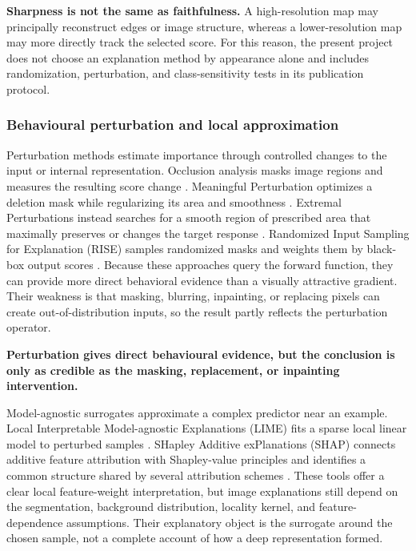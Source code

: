 \textbf{Sharpness is not the same as faithfulness.} A high-resolution map may
principally reconstruct edges or image structure, whereas a lower-resolution
map may more directly track the selected score. For this reason, the present
project does not choose an explanation method by appearance alone and includes
randomization, perturbation, and class-sensitivity tests in its publication
protocol.

\subsubsection{Behavioural perturbation and local approximation}

Perturbation methods estimate importance through controlled changes to the
input or internal representation. Occlusion analysis masks image regions and
measures the resulting score change \cite{zeiler2014visualizing}. Meaningful
Perturbation optimizes a deletion mask while regularizing its area and
smoothness \cite{fong2017meaningful}. Extremal Perturbations instead searches
for a smooth region of prescribed area that maximally preserves or changes the
target response \cite{fong2019extremal}. Randomized Input Sampling for
Explanation (RISE) samples randomized masks and
weights them by black-box output scores \cite{petsiuk2018rise}. Because these
approaches query the forward function, they can provide more direct behavioral
evidence than a visually attractive gradient. Their weakness is that masking,
blurring, inpainting, or replacing pixels can create out-of-distribution
inputs, so the result partly reflects the perturbation operator.

\textbf{Perturbation gives direct behavioural evidence, but the conclusion is
only as credible as the masking, replacement, or inpainting intervention.}

Model-agnostic surrogates approximate a complex predictor near an example.
Local Interpretable Model-agnostic Explanations (LIME) fits a sparse local
linear model to perturbed samples \cite{ribeiro2016lime}. SHapley Additive
exPlanations (SHAP) connects additive feature attribution with
Shapley-value principles and identifies a common structure shared by several
attribution schemes \cite{lundberg2017shap}. These tools offer a clear local
feature-weight interpretation, but image explanations still depend on the
segmentation, background distribution, locality kernel, and feature-dependence
assumptions. Their explanatory object is the surrogate around the chosen
sample, not a complete account of how a deep representation formed.

